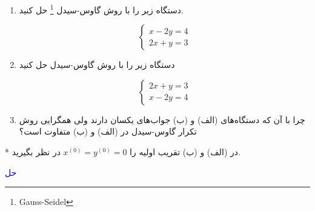 \begin{enumerate}
\item \label{second} دستگاه زیر را با روش 
گاوس-سیدل
\footnote{Gauss-Seidel}
حل کنید.
    \begin{center}
    \[
        \begin{cases}
          x - 2y = 4\\
          2x + y = 3
        \end{cases}
    \]
    \end{center}
\item \label{first} 
دستگاه زیر را با روش 
گاوس-سیدل
حل کنید
\begin{center}
\[
    \begin{cases}
      2x + y = 3 \\
      x - 2y = 4
    \end{cases}
\]
\end{center}
\item 
چرا با آن که دستگاه‌های 
(الف)
و
(ب)
جواب‌های یکسان دارند ولی همگرایی روش تکرار گاوس-سیدل در 
(الف)
و
(ب)
متفاوت است؟
\end{enumerate}
\noindent \hspace{0.5em} * در 
(الف)
و
(ب)
تقریب اولیه را
$x^{(0)} = y^{(0)} = 0$
در نظر بگیرید.

\textcolor{blue}{
حل 
\\

}
